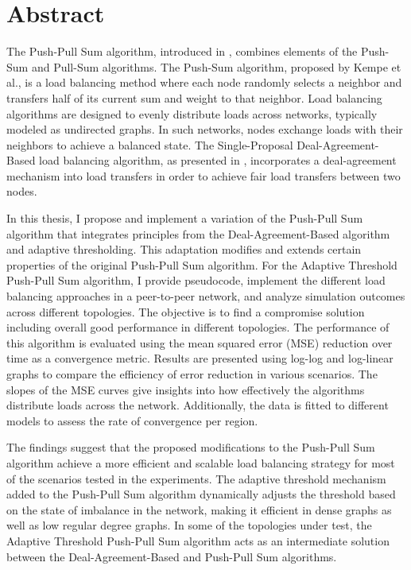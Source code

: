 \chapter*{Abstract}

The Push-Pull Sum algorithm, introduced in \cite{nugroho2023PushPullSumDataAg}, combines elements of the Push-Sum \cite{kempe2003gossipbasedComp} and Pull-Sum algorithms. The Push-Sum algorithm, proposed by Kempe et al., is a load balancing method where each node randomly selects a neighbor and transfers half of its current sum and weight to that neighbor. Load balancing algorithms are designed to evenly distribute loads across networks, typically modeled as undirected graphs. In such networks, nodes exchange loads with their neighbors to achieve a balanced state. The Single-Proposal Deal-Agreement-Based load balancing algorithm, as presented in \cite{Dinitz2023DAB}, incorporates a deal-agreement mechanism into load transfers in order to achieve fair load transfers between two nodes.

In this thesis, I propose and implement a variation of the Push-Pull Sum algorithm that integrates principles from the Deal-Agreement-Based algorithm and adaptive thresholding. This adaptation modifies and extends certain properties of the original Push-Pull Sum algorithm. For the Adaptive Threshold Push-Pull Sum algorithm, I provide pseudocode, implement the different load balancing approaches in a peer-to-peer network, and analyze simulation outcomes across different topologies. The objective is to find a compromise solution including overall good performance in different topologies. The performance of this algorithm is evaluated using the mean squared error (MSE) reduction over time as a convergence metric. Results are presented using log-log and log-linear graphs to compare the efficiency of error reduction in various scenarios. The slopes of the MSE curves give insights into how effectively the algorithms distribute loads across the network. Additionally, the data is fitted to different models to assess the rate of convergence per region.

The findings suggest that the proposed modifications to the Push-Pull Sum algorithm achieve a more efficient and scalable load balancing strategy for most of the scenarios tested in the experiments. The adaptive threshold mechanism added to the Push-Pull Sum algorithm dynamically adjusts the threshold based on the state of imbalance in the network, making it efficient in dense graphs as well as low regular degree graphs. In some of the topologies under test, the Adaptive Threshold Push-Pull Sum algorithm acts as an intermediate solution between the Deal-Agreement-Based and Push-Pull Sum algorithms.